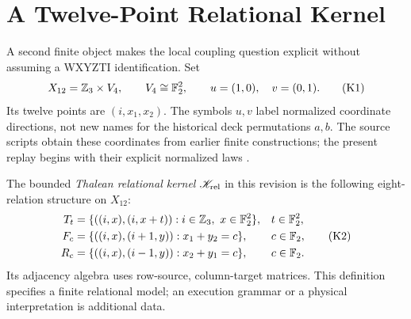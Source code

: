 \begingroup
\renewcommand{\thesection}{2C}
\section{A Twelve-Point Relational Kernel}\label{sec:relkernel}
A second finite object makes the local coupling question explicit without assuming a WXYZTI identification. Set
\begin{equation}
X_{12}=\mathbb Z_3\times V_4,
\qquad V_4\cong\mathbb F_2^2,
\qquad u=(1,0),\quad v=(0,1).
\tag{K1}\label{eq:kernelpoints}
\end{equation}
Its twelve points are $(i,x_1,x_2)$. The symbols $u,v$ label normalized coordinate directions, not new names for the historical deck permutations $a,b$. The source scripts obtain these coordinates from earlier finite constructions; the present replay begins with their explicit normalized laws \citep{rank8source,rank8group}.

\begin{definition}\label{def:relkernel}
The bounded \emph{Thalean relational kernel} $\mathscr K_{\rm rel}$ in this revision is the following eight-relation structure on $X_{12}$:
\begin{align}
T_t&=\{((i,x),(i,x+t)):i\in\mathbb Z_3,\ x\in\mathbb F_2^2\},
&&t\in\mathbb F_2^2,\notag\\
F_c&=\{((i,x),(i+1,y)):x_1+y_2=c\},
&&c\in\mathbb F_2,\tag{K2}\label{eq:kernelrelations}\\
R_c&=\{((i,x),(i-1,y)):x_2+y_1=c\},
&&c\in\mathbb F_2.\notag
\end{align}
Its adjacency algebra uses row-source, column-target matrices. This definition specifies a finite relational model; an execution grammar or a physical interpretation is additional data.
\end{definition}

